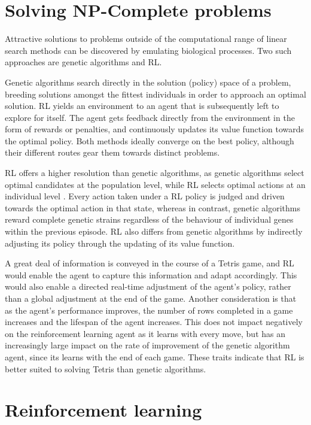 \documentclass{rucsthesis}
\begin{document}
\section{Solving NP-Complete problems}

Attractive solutions to problems outside of the computational range of linear search methods can be discovered by emulating biological processes. Two such approaches are genetic algorithms and RL. 

Genetic algorithms search directly in the solution (policy) space of a problem, breeding solutions amongst the fittest individuals in order to approach an optimal solution. RL yields an environment to an agent that is subsequently left to explore for itself. The agent gets feedback directly from the environment in the form of rewards or penalties, and continuously updates its value function towards the optimal policy. Both methods ideally converge on the best policy\citep{evvsrl}, although their different routes gear them towards distinct problems.

RL offers a higher resolution than genetic algorithms, as genetic algorithms select optimal candidates at the population level, while RL  selects optimal actions at an individual level \citep{evvsrl}. Every action taken under a RL policy is judged and driven towards the optimal action in that state, whereas in contrast, genetic algorithms reward complete genetic strains regardless of the behaviour of individual genes within the previous episode. RL also differs from genetic algorithms by indirectly adjusting its policy through the updating of its value function. 

A great deal of information is conveyed in the course of a Tetris game, and RL would enable the agent to capture this information and adapt accordingly.  This would also enable a directed real-time adjustment of the agent's policy, rather than a global adjustment at the end of the game. Another consideration is that as the agent's performance improves, the number of rows completed in a game increases and the lifespan of the agent increases. This does not impact negatively on the reinforcement learning agent as it learns with every move, but has an increasingly large impact on the rate of improvement of the genetic algorithm agent, since its learns with the end of each game. These traits indicate that RL is better suited to solving Tetris than genetic algorithms. 

\section{Reinforcement learning}
\end{document}

